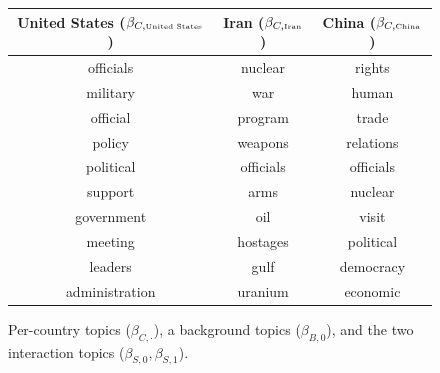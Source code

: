 \begin{figure}
\begin{tabular}{|c|c|c|}
  \textbf{United States ($\beta_{C,\mbox{\tiny United States}}$)} &
  \textbf{Iran ($\beta_{C,\mbox{\tiny Iran}}$)} &
  \textbf{China ($\beta_{C,\mbox{\tiny China}}$)} \\
  \hline
  officials & nuclear & rights \\
  military & war & human \\
  official & program & trade \\
  policy & weapons & relations \\
  political & officials & officials \\
  support & arms & nuclear \\
  government & oil & visit \\
  meeting & hostages & political \\
  leaders & gulf & democracy \\
  administration & uranium & economic \\
  \hline
\end{tabular}
\caption{Per-country topics ($\beta_{C,\cdot}$), a background topics ($\beta_{B,0}$), and the two interaction topics ($\beta_{S,0}, \beta_{S,1}$).}
\label{fig:fr_unsupervised_topics}
\end{figure}


